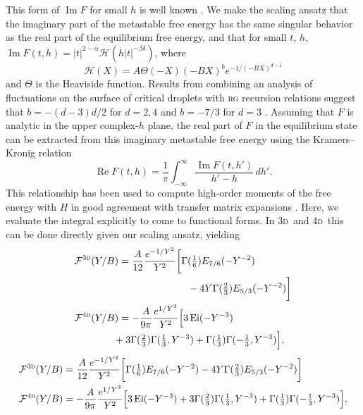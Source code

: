 \documentclass[aps,prl,reprint]{revtex4-1}
\def\[{\begin{equation}}
\def\]{\end{equation}}
\def\ei{\mathop{\mathrm{Ei}}\nolimits} %
\def\re{\mathop{\mathrm{Re}}\nolimits}
\def\im{\mathop{\mathrm{Im}}\nolimits}
\def\dd{d} %
\def\fF{\mathcal F}  %
\def\fiF{\mathcal H} %
\def\dim{d}
\def\threedee{\textsc{3d}}
\def\fourdee{\textsc{4d}}
\newif\ifreprint
\begin{document}
This form of $\im F$ for small $h$ is well known
\cite{langer.1967.condensation,harris.1984.metastability}.  We make the
scaling ansatz that the imaginary part of the metastable free energy has the
same singular behavior as the real part of the equilibrium free energy, and
that for small $t$, $h$, $\im F(t,h)=|t|^{2-\alpha}\fiF(h|t|^{-\beta\delta})$,
where
\[
  \fiF(X)=A\Theta(-X)(-BX)^be^{-1/(-BX)^{\dim-1}}
  \label{eq:im.scaling}
\]
and $\Theta$ is the Heaviside function. Results from combining an analysis of
fluctuations on the surface of critical droplets with \textsc{rg} recursion
relations suggest that $b=-(d-3)d/2$ for $d=2,4$ and $b=-7/3$ for $d=3$
\cite{houghton.1980.metastable,rudnick.1976.equations,gunther.1980.goldstone}.
Assuming that $F$ is analytic in the upper complex-$h$ plane, the real part of
$F$ in the equilibrium state can be extracted from this imaginary metastable
free energy using the Kramers--Kronig relation
\[
  \re F(t,h)=\frac1\pi\int_{-\infty}^\infty\frac{\im F(t,h')}{h'-h}\,\dd h'.
  \label{eq:kram-kron}
\]
This relationship has been used to compute high-order moments of the free
energy with $H$ in good agreement with transfer matrix expansions
\cite{lowe.1980.instantons}. Here, we evaluate the integral explicitly to come
to
functional forms.  In \threedee\ and \fourdee\ this can be done directly
given our scaling ansatz, yielding
\def\eqthreedeeone{
  \fF^\threedee(Y/B)&=
  \frac{A}{12}\frac{e^{-1/Y^2}}{Y^2}
  \bigg[\Gamma(\tfrac16)E_{7/6}(-Y^{-2})
}
\def\eqthreedeetwo{
  -4Y\Gamma(\tfrac23)E_{5/3}(-Y^{-2})\bigg]
}
\def\eqfourdeeone{
  \fF^\fourdee(Y/B)&=
  -\frac{A}{9\pi}\frac{e^{1/Y^3}}{Y^2}
  \Big[3\ei(-Y^{-3})
}
\def\eqfourdeetwo{
  +3\Gamma(\tfrac23)\Gamma(\tfrac13,Y^{-3})
  +\Gamma(\tfrac13)\Gamma(-\tfrac13,Y^{-3})\Big]
}
\ifreprint
\begin{align}
  &\begin{aligned}
    \eqthreedeeone\\
    &\hspace{7em}
    \eqthreedeetwo
  \end{aligned}
  \\
  &\begin{aligned}
    \eqfourdeeone
    \\
    &\hspace{-0.5em}
    \eqfourdeetwo,
  \end{aligned}
\end{align}
\else
\begin{align}
  \eqthreedeeone\eqthreedeetwo
  \\
  \eqfourdeeone\eqfourdeetwo,
\end{align}
\end{document}
